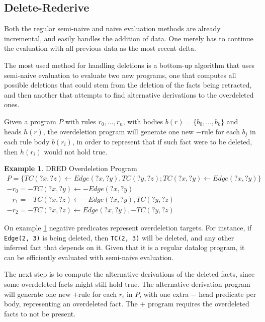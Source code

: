 \documentclass[sigconf,screen,review,natbib]{acmart}
\theoremstyle{definition}
\newtheorem{exmp}{Example}[section]
\begin{document}
\subsection{Delete-Rederive}

Both the regular semi-naive and naive evaluation methods are already incremental, and easily handles the
addition of data. One merely has to continue the evaluation with all previous data as the most recent delta.

The most used method for handling deletions is a bottom-up algorithm\cite{dred} that uses semi-naive evaluation
to evaluate two new programs, one that computes all possible deletions that could stem from the deletion of the
facts being retracted, and then another that attempts to find alternative derivations to the overdeleted ones.

Given a program $P$ with rules $r_0, ..., r_n$, with bodies $b(r) = \{b_0, ..., b_k\}$ and heads $h(r)$, the
overdeletion program will generate one new $-$rule for each $b_j$ in each rule body $b(r_i)$, in order to represent
that if such fact were to be deleted, then $h(r_i)$ would not hold true.

\begin{exmp}{DRED Overdeletion Program}
	\tiny
	\begin{align}
		P = \{ TC(?x, ?z) \leftarrow Edge(?x, ?y), TC(?y, ?z); TC(?x, ?y) \leftarrow Edge(?x, ?y) \} \nonumber                                                \\
		-r_0 = -TC(?x, ?y) \leftarrow -Edge(?x, ?y)                                                                                                           \\
		-r_1 = -TC(?x, ?z) \leftarrow -Edge(?x, ?y), TC(?y, ?z)                                                                                     \nonumber \\
		-r_2 = -TC(?x, ?z) \leftarrow Edge(?x, ?y), -TC(?y, ?z)
	\end{align}
	\label{ex6}
\end{exmp}

On example \ref{ex6} negative predicates represent overdeletion targets. For instance, if \verb|Edge(2, 3)| is
being deleted, then \verb|TC(2, 3)| will be deleted, and any other inferred fact that depends on it. Given that
it is a regular datalog program, it can be efficiently evaluated with semi-naive evaluation.

The next step is to compute the alternative derivations of the deleted facts, since some overdeleted facts might
still hold true. The alternative derivation program will generate one new $+$rule for each $r_i$ in $P$, with
one extra $-$ head predicate per body, representing an overdeleted fact. The $+$ program requires the overdeleted
facts to not be present.
\end{document}
